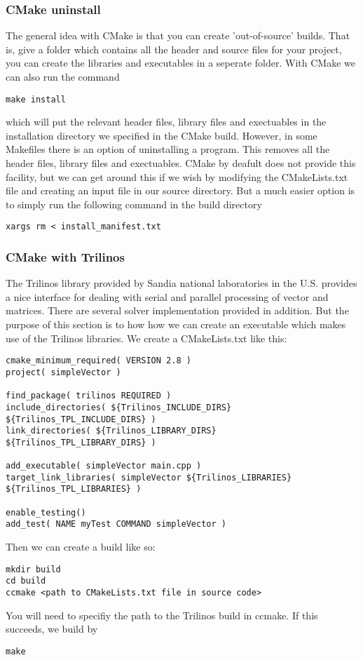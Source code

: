 \documentclass[a4paper, 10pt]{article}
\begin{document}
\subsubsection*{CMake uninstall}
\label{sec:cmake-uninstall}

The general idea with CMake is that you can create 'out-of-source'
builds. That is, give a folder which contains all the header and
source files for your project, you can create the libraries and
executables in a seperate folder. With CMake we can also run the
command
\begin{verbatim}
make install
\end{verbatim}
which will put the relevant header files, library files and
exectuables in the installation directory we specified in the CMake
build. However, in some Makefiles there is an option of uninstalling a
program. This removes all the header files, library files and
exectuables. CMake by deafult does not provide this facility, but we
can get around this if we wish by modifying the CMakeLists.txt file
and creating an input file in our source directory. But a much easier
option is to simply run the following command in the build directory
\begin{verbatim}
xargs rm < install_manifest.txt 
\end{verbatim}

\subsubsection*{CMake with Trilinos}
\label{sec:cmake-with-trilinos}

The Trilinos library provided by Sandia national laboratories in the
U.S. provides a nice interface for dealing with serial and parallel
processing of vector and matrices. There are several solver
implementation provided in addition. But the purpose of this section
is to how how we can create an executable which makes use of the
Trilinos libraries. We create a CMakeLists.txt like this:
\begin{verbatim}
cmake_minimum_required( VERSION 2.8 )
project( simpleVector )

find_package( trilinos REQUIRED )
include_directories( ${Trilinos_INCLUDE_DIRS} ${Trilinos_TPL_INCLUDE_DIRS} )
link_directories( ${Trilinos_LIBRARY_DIRS} ${Trilinos_TPL_LIBRARY_DIRS} )

add_executable( simpleVector main.cpp )
target_link_libraries( simpleVector ${Trilinos_LIBRARIES} ${Trilinos_TPL_LIBRARIES} )

enable_testing()
add_test( NAME myTest COMMAND simpleVector )
\end{verbatim}
Then we can create a build like so:
\begin{verbatim}
mkdir build
cd build
ccmake <path to CMakeLists.txt file in source code>
\end{verbatim}
You will need to specifiy the path to the Trilinos build in ccmake. If
this succeeds, we build by 
\begin{verbatim}
make
\end{verbatim}
\end{document}
